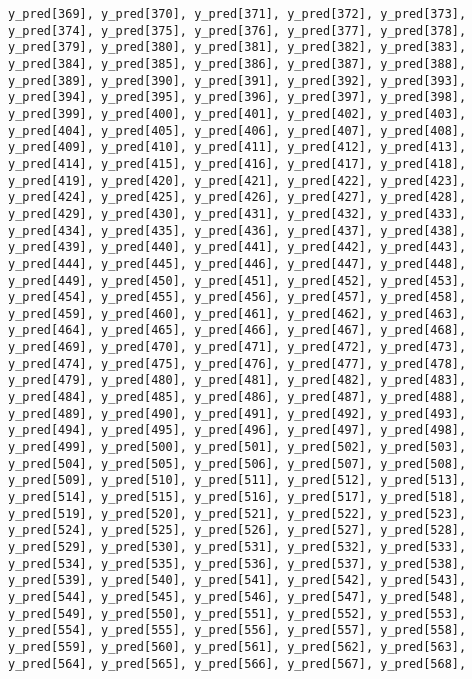 \documentclass[
  letterpaper,
  DIV=11,
  numbers=noendperiod]{scrartcl}
\begin{document}
\begin{verbatim}
y_pred[369], y_pred[370], y_pred[371], y_pred[372], y_pred[373],
y_pred[374], y_pred[375], y_pred[376], y_pred[377], y_pred[378],
y_pred[379], y_pred[380], y_pred[381], y_pred[382], y_pred[383],
y_pred[384], y_pred[385], y_pred[386], y_pred[387], y_pred[388],
y_pred[389], y_pred[390], y_pred[391], y_pred[392], y_pred[393],
y_pred[394], y_pred[395], y_pred[396], y_pred[397], y_pred[398],
y_pred[399], y_pred[400], y_pred[401], y_pred[402], y_pred[403],
y_pred[404], y_pred[405], y_pred[406], y_pred[407], y_pred[408],
y_pred[409], y_pred[410], y_pred[411], y_pred[412], y_pred[413],
y_pred[414], y_pred[415], y_pred[416], y_pred[417], y_pred[418],
y_pred[419], y_pred[420], y_pred[421], y_pred[422], y_pred[423],
y_pred[424], y_pred[425], y_pred[426], y_pred[427], y_pred[428],
y_pred[429], y_pred[430], y_pred[431], y_pred[432], y_pred[433],
y_pred[434], y_pred[435], y_pred[436], y_pred[437], y_pred[438],
y_pred[439], y_pred[440], y_pred[441], y_pred[442], y_pred[443],
y_pred[444], y_pred[445], y_pred[446], y_pred[447], y_pred[448],
y_pred[449], y_pred[450], y_pred[451], y_pred[452], y_pred[453],
y_pred[454], y_pred[455], y_pred[456], y_pred[457], y_pred[458],
y_pred[459], y_pred[460], y_pred[461], y_pred[462], y_pred[463],
y_pred[464], y_pred[465], y_pred[466], y_pred[467], y_pred[468],
y_pred[469], y_pred[470], y_pred[471], y_pred[472], y_pred[473],
y_pred[474], y_pred[475], y_pred[476], y_pred[477], y_pred[478],
y_pred[479], y_pred[480], y_pred[481], y_pred[482], y_pred[483],
y_pred[484], y_pred[485], y_pred[486], y_pred[487], y_pred[488],
y_pred[489], y_pred[490], y_pred[491], y_pred[492], y_pred[493],
y_pred[494], y_pred[495], y_pred[496], y_pred[497], y_pred[498],
y_pred[499], y_pred[500], y_pred[501], y_pred[502], y_pred[503],
y_pred[504], y_pred[505], y_pred[506], y_pred[507], y_pred[508],
y_pred[509], y_pred[510], y_pred[511], y_pred[512], y_pred[513],
y_pred[514], y_pred[515], y_pred[516], y_pred[517], y_pred[518],
y_pred[519], y_pred[520], y_pred[521], y_pred[522], y_pred[523],
y_pred[524], y_pred[525], y_pred[526], y_pred[527], y_pred[528],
y_pred[529], y_pred[530], y_pred[531], y_pred[532], y_pred[533],
y_pred[534], y_pred[535], y_pred[536], y_pred[537], y_pred[538],
y_pred[539], y_pred[540], y_pred[541], y_pred[542], y_pred[543],
y_pred[544], y_pred[545], y_pred[546], y_pred[547], y_pred[548],
y_pred[549], y_pred[550], y_pred[551], y_pred[552], y_pred[553],
y_pred[554], y_pred[555], y_pred[556], y_pred[557], y_pred[558],
y_pred[559], y_pred[560], y_pred[561], y_pred[562], y_pred[563],
y_pred[564], y_pred[565], y_pred[566], y_pred[567], y_pred[568],

\end{verbatim}
\end{document}
